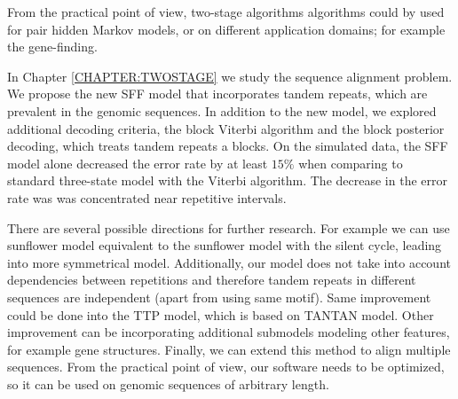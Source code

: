 From the practical point of view, two-stage algorithms algorithms could by used
for pair hidden Markov models, or on different application domains; for example
the gene-finding.

In Chapter \ref{CHAPTER:TWOSTAGE} we study the sequence alignment problem. We
propose the new SFF model that incorporates tandem repeats, which are prevalent
in the genomic sequences. In addition to the new model, we explored additional
decoding criteria, the block Viterbi algorithm and the block posterior
decoding, which treats tandem repeats a blocks. On the simulated data, the SFF
model alone decreased the error rate by at least $15\%$ when comparing to
standard three-state model with the Viterbi algorithm. The decrease in the
error rate was was concentrated near repetitive intervals. 

There are several possible directions for further research. For example we can
use sunflower model equivalent to the sunflower model with the silent cycle,
leading into more symmetrical model. Additionally, our model does not take into
account dependencies between repetitions and therefore tandem repeats in
different sequences are independent (apart from using same motif). Same
improvement could be done into the TTP model, which is based on TANTAN model.
Other improvement can be incorporating additional submodels modeling other
features, for example gene structures. Finally, we can extend this method to
align multiple sequences. From the practical point of view, our software needs
to be optimized, so it can be used on genomic sequences of arbitrary length.

\begin{comment}
\begin{reformulate*}
Kapitola 3 -- ukazali sme ze two-stage vie pomoct v presnosti, 
daju sa skumat dalsie uplatnenia na ine domeny, a vhodne guide funkcie.

Ako by sa vysledky dali rozsirit na parove modely, vie mi to ze mam 2 pasky v niecom pomoct? kosntantne modely  apodobne? Mozu tam byt nejake aproximacne algoritmy s dobrym pomerom?, pripadne vedia guided
algorititmy pomoct aj pri parovych HMM? 

Kapitola 4: Ukazali sme taky a taky model a algoritmus, daval take a take vysledky  Dal by sa pouzit model s cyklom
stavov, bol by viac symetricky. Dali by sa pridat dalsie submodely (hladanie
genov). Da sa viac rozvinut TANTAN model, pripadne modelovat evoluciu
repeticii. Ma zmysel kombinovat (z praktickeho hladicka) dalsie sumbodely s
repeatovym, kedze su tie modely nezavisle.

\end{reformulate*}
\end{comment}
\label{LastPage}
